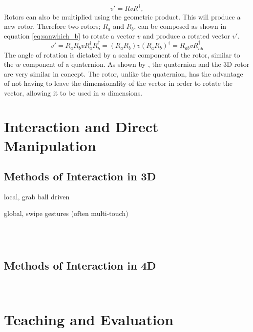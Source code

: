 \documentclass{l4proj}
\begin{document}
%
\begin{equation}
  \label{eq:sanwhich_a}
    v' = R v R^\dagger,
\end{equation}
%
Rotors can also be multiplied using the geometric product. This will produce a new rotor. Therefore two rotors; $R_a$ and $R_b$, can be composed as shown in equation \ref{eq:sanwhich_b} to rotate a vector \(v\) and produce a rotated vector \(v'\).
%
\begin{equation}
  \label{eq:sanwhich_b}
  v' = R_a R_b v R_a^{\dagger} R_b^{\dagger}
   = (R_a R_b) v (R_a R_b)^{\dagger}
   = R_{ab}^{} v R_{ab}^{\dagger}
\end{equation}
%
The angle of rotation is dictated by a scalar component of the rotor, similar to the \(w\) component of a quaternion. 
As shown by \citep{bosch_code_nodate}, the quaternion and the 3D rotor are very similar in concept. The rotor, unlike the quaternion, has the advantage of not having to leave the dimensionality of the vector in order to rotate the vector, allowing it to be used in \(n\) dimensions.

\section{Interaction and Direct Manipulation}

\subsection{Methods of Interaction in 3D}

local, grab ball driven

global, swipe gestures (often multi-touch)

\citep{shoemake_arcball_1994}\\
\citep{hinckley_usability_1997}\\
\citep{balakrishnan_rockinmouse_1997}

\subsection{Methods of Interaction in 4D}

\citep{murata_interactive_2000}\\
\citep{kageyama_keyboard-based_2005}

\section{Teaching and Evaluation}
\end{document}
